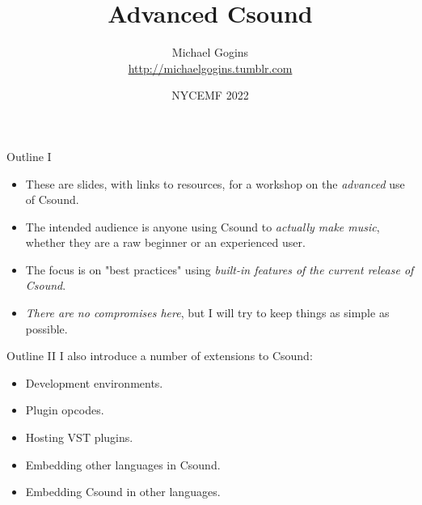 \documentclass{beamer}
\title{Advanced Csound}
\author[Gogins] %
{Michael Gogins \\ \url{http://michaelgogins.tumblr.com} }
\institute[Irreducible Productions] %
{
    Irreducible Productions\\
    New York
}
\date[NYCEMF 2022] %
{NYCEMF 2022}
\begin{document}
    
    \begin{frame}
        \titlepage
    \end{frame}
    
    \begin{frame}{Outline I}
        \begin{itemize}
            \item These are slides, with links to resources, for a workshop on the
            \textit{advanced} use of Csound.
            
            \item The intended audience is anyone using Csound to \textit{actually make
                music}, whether they are a raw beginner or an experienced user.
            
            \item The focus is on "best practices" using \textit{built-in features of
                the current release of Csound}.
            
            \item \textit{There are no compromises here}, but I will try to keep things
            as simple as possible.
        \end{itemize}
    \end{frame}
    
    \begin{frame}{Outline II}
        I also introduce a number of extensions to Csound: 
        \begin{itemize}
            \item Development environments.
            \item Plugin opcodes.
            \item Hosting VST plugins.
            \item Embedding other languages in Csound.
            \item Embedding Csound in other languages.
        \end{itemize}
    \end{frame}
    
\end{document}
